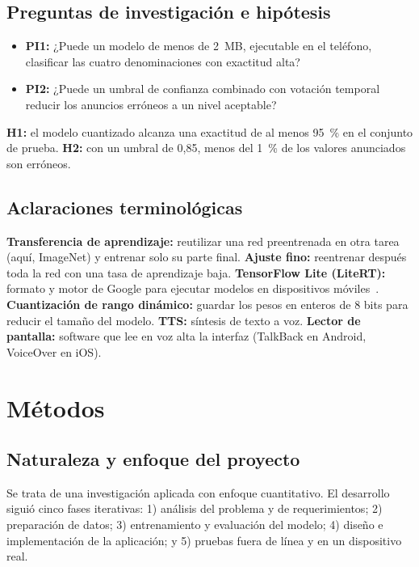 \documentclass[conference,a4paper]{IEEEtran}
\begin{document}
\subsection{Preguntas de investigación e hipótesis}

\begin{itemize}
\item \textbf{PI1:} ¿Puede un modelo de menos de 2~MB, ejecutable en el teléfono, clasificar las cuatro denominaciones con exactitud alta?
\item \textbf{PI2:} ¿Puede un umbral de confianza combinado con votación temporal reducir los anuncios erróneos a un nivel aceptable?
\end{itemize}

\textbf{H1:} el modelo cuantizado alcanza una exactitud de al menos 95~\% en el conjunto de prueba. \textbf{H2:} con un umbral de 0,85, menos del 1~\% de los valores anunciados son erróneos.

\subsection{Aclaraciones terminológicas}

\textbf{Transferencia de aprendizaje:} reutilizar una red preentrenada en otra tarea (aquí, ImageNet) y entrenar solo su parte final. \textbf{Ajuste fino:} reentrenar después toda la red con una tasa de aprendizaje baja. \textbf{TensorFlow Lite (LiteRT):} formato y motor de Google para ejecutar modelos en dispositivos móviles~\cite{litert}. \textbf{Cuantización de rango dinámico:} guardar los pesos en enteros de 8 bits para reducir el tamaño del modelo. \textbf{TTS:} síntesis de texto a voz. \textbf{Lector de pantalla:} software que lee en voz alta la interfaz (TalkBack en Android, VoiceOver en iOS).

\section{Métodos}

\subsection{Naturaleza y enfoque del proyecto}

Se trata de una investigación aplicada con enfoque cuantitativo. El desarrollo siguió cinco fases iterativas: 1) análisis del problema y de requerimientos; 2) preparación de datos; 3) entrenamiento y evaluación del modelo; 4) diseño e implementación de la aplicación; y 5) pruebas fuera de línea y en un dispositivo real.
\end{document}
